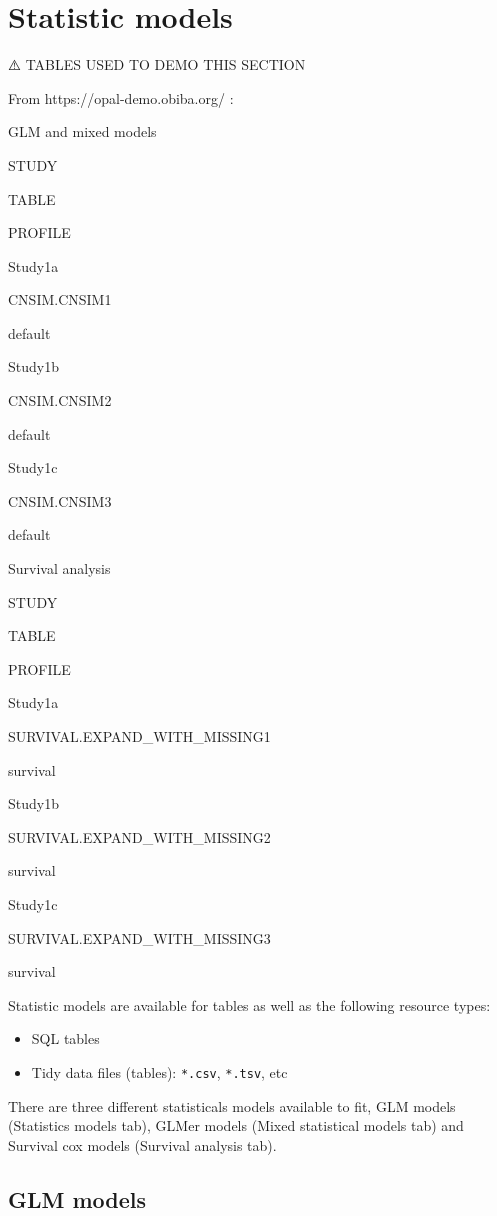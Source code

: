 \documentclass[
]{book}
\providecommand{\tightlist}{%
  \setlength{\itemsep}{0pt}\setlength{\parskip}{0pt}}
\begin{document}
\hypertarget{statistic-models}{%
\section{Statistic models}\label{statistic-models}}

⚠️ TABLES USED TO DEMO THIS SECTION

From https://opal-demo.obiba.org/ :

GLM and mixed models

STUDY

TABLE

PROFILE

Study1a

CNSIM.CNSIM1

default

Study1b

CNSIM.CNSIM2

default

Study1c

CNSIM.CNSIM3

default

Survival analysis

STUDY

TABLE

PROFILE

Study1a

SURVIVAL.EXPAND\_WITH\_MISSING1

survival

Study1b

SURVIVAL.EXPAND\_WITH\_MISSING2

survival

Study1c

SURVIVAL.EXPAND\_WITH\_MISSING3

survival

Statistic models are available for tables as well as the following resource types:

\begin{itemize}
\tightlist
\item
  SQL tables
\item
  Tidy data files (tables): \texttt{*.csv}, \texttt{*.tsv}, etc
\end{itemize}

There are three different statisticals models available to fit, GLM models (Statistics models tab), GLMer models (Mixed statistical models tab) and Survival cox models (Survival analysis tab).

\hypertarget{glm-models}{%
\subsection{GLM models}\label{glm-models}}
\end{document}
